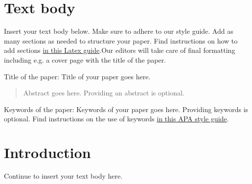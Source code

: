 \section{Text body}
\textcolor{cssj_purple}{Insert your text body below.
Make sure to adhere to our style guide. Add as many sections as needed to structure your paper. Find instructions on how to add sections \href{https://www.overleaf.com/learn/latex/Sections_and_chapters#Numbered_and_unnumbered_sections}{in this Latex guide}.Our editors will take care of final formatting including e.g. a cover page with the title of the paper.}\newline

\begin{flushleft}
Title of the paper:
\textcolor{cssj_purple}{Title of your paper goes here.}
\end{flushleft}

\begin{abstract}
\textcolor{cssj_purple}{Abstract goes here. Providing an abstract is optional.}
\end{abstract}

\begin{flushleft}
Keywords of the paper: 
\textcolor{cssj_purple}{Keywords of your paper goes here. Providing keywords is optional. Find instructions on the use of keywords \href{https://apastyle.apa.org/instructional-aids/abstract-keywords-guide.pdf}{in this APA style guide}.}
\end{flushleft}

\section*{Introduction}
\textcolor{cssj_purple}{Continue to insert your text body here.}
